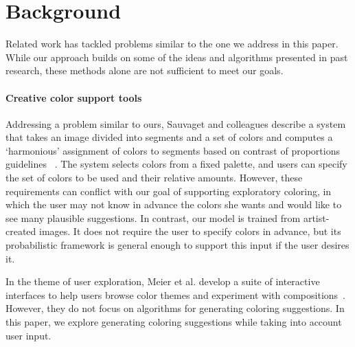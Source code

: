 \section{Background}
\label{sec:background}

Related work has tackled problems similar to the one we address in this paper. While our approach builds on some of the ideas and algorithms presented in past research, these methods alone are not sufficient to meet our goals.

\paragraph{Creative color support tools}
Addressing a problem similar to ours, Sauvaget and colleagues describe a system that takes an image divided into segments and a set of colors and computes a `harmonious' assignment of colors to segments based on contrast of proportions guidelines ~. The system selects colors from a fixed palette, and users can specify the set of colors to be used and their relative amounts. However, these requirements can conflict with our goal of supporting exploratory coloring, in which the user may not know in advance the colors she wants and would like to see many plausible suggestions. In contrast, our model is trained from artist-created images. It does not require the user to specify colors in advance, but its probabilistic framework is general enough to support this input if the user desires it.

In the theme of user exploration, Meier et al. develop a suite of interactive interfaces to help users browse color themes and experiment with compositions~. However, they do not focus on algorithms for generating coloring suggestions. In this paper, we explore generating coloring suggestions while taking into account user input.

